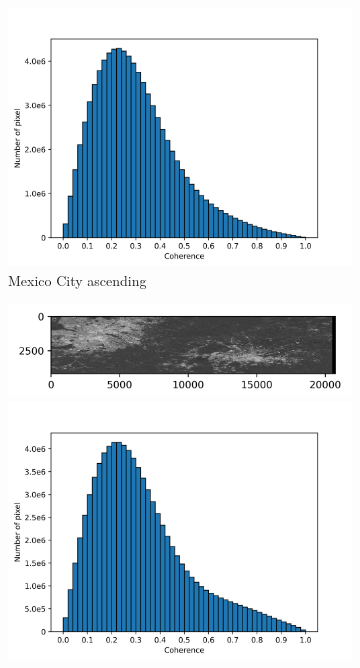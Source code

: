 \documentclass[a4paper,fleqn]{cas-sc}
\begin{document}
\begin{figure}
\begin{subfigure}{0.5\textwidth}
\begin{minipage}{0.5\textwidth}
        \end{minipage}%
        \begin{minipage}{0.5\textwidth}
            \centering
            \includegraphics[width=\textwidth]{figure/The coherence/coh_Mexico_asc_esd1_histogram_.png}
        \end{minipage}
        \caption{Mexico City ascending}
        \label{fig_6c}
    \end{subfigure}%
    \begin{subfigure}{0.5\textwidth}
        \centering
        \begin{minipage}{0.5\textwidth}
            \centering
            \includegraphics[width=\textwidth]{figure/The coherence/coh_Mexico_des_esd1.png}
        \end{minipage}%
        \begin{minipage}{0.5\textwidth}
            \centering
            \includegraphics[width=\textwidth]{figure/The coherence/coh_Mexico_des_esd1_histogram_.png}

\end{minipage}
\end{subfigure}
\end{figure}
\end{document}
